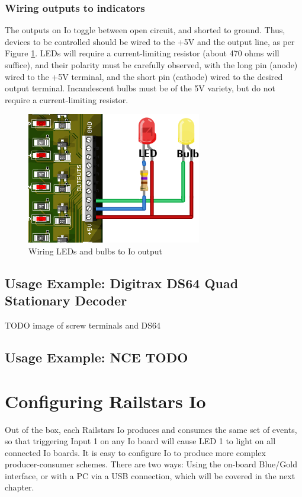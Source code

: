 \documentclass[12pt]{book}
\begin{document}
\subsection{Wiring outputs to indicators}

The outputs on Io toggle between open circuit, and shorted to ground. Thus, devices to be controlled should be wired to the +5V and the output line, as per Figure \ref{indicators}. LEDs will require a current-limiting resistor (about 470 ohms will suffice), and their polarity must be carefully observed, with the long pin (anode) wired to the +5V terminal, and the short pin (cathode) wired to the desired output terminal. Incandescent bulbs must be of the 5V variety, but do not require a current-limiting resistor.

\begin{figure}[htbp]
\begin{center}
\includegraphics[width=3in]{images/Outputs-indicator.png}
\caption{Wiring LEDs and bulbs to Io output}
\label{indicators}
\end{center}
\end{figure}

\section{Usage Example: Digitrax DS64 Quad Stationary Decoder}

TODO image of screw terminals and DS64

\section{Usage Example: NCE TODO}

\chapter{Configuring Railstars Io}

Out of the box, each Railstars Io produces and consumes the same set of events, so that triggering Input 1 on any Io board will cause LED 1 to light on all connected Io boards. It is easy to configure Io to produce more complex producer-consumer schemes. There are two ways: Using the on-board Blue/Gold interface, or with a PC via a USB connection, which will be covered in the next chapter.
\end{document}

